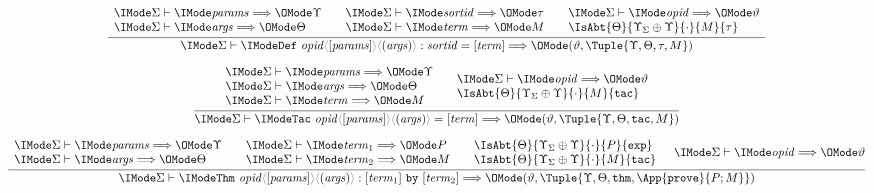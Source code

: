 \begin{gather}
  \infer{
    \Elab{\Sigma}{
      \ProdDefDecl{\SortOpId}{\SortParams}{\SortArgs}{\SortSortId}{\SortTerm}
    }{(\vartheta,\Tuple{\Upsilon,\Theta,\tau,M})}
  }{
    \begin{array}{l}
      \Elab{\Sigma}{\SortParams}{\Upsilon}\\
      \Elab{\Sigma}{\SortArgs}{\Theta}\\
    \end{array} &
    \begin{array}{l}
      \Elab{\Sigma}{\SortSortId}{\tau}\\
      \Elab{\Sigma}{\SortTerm}{M}
    \end{array} &
    \begin{array}{l}
      \Elab{\Sigma}{\SortOpId}{\vartheta}\\
      \IsAbt{\Theta}{\Upsilon_\Sigma\oplus\Upsilon}{\cdot}{M}{\tau}
    \end{array}
  }\\[6pt]
  \infer{
    \Elab{\Sigma}{
      \ProdTacDecl{\SortOpId}{\SortParams}{\SortArgs}{\SortTerm}
    }{(\vartheta,\Tuple{\Upsilon,\Theta,\AbtSortTac,M})}
  }{
    \begin{array}{l}
      \Elab{\Sigma}{\SortParams}{\Upsilon}\\
      \Elab{\Sigma}{\SortArgs}{\Theta}\\
      \Elab{\Sigma}{\SortTerm}{M}
    \end{array} &
    \begin{array}{l}
      \Elab{\Sigma}{\SortOpId}{\vartheta}\\
      \IsAbt{\Theta}{\Upsilon_\Sigma\oplus\Upsilon}{\cdot}{M}{\AbtSortTac}
    \end{array}
  }\\[6pt]
  \infer{
    \Elab{\Sigma}{
      \ProdThmDecl{\SortOpId}{\SortParams}{\SortArgs}{\SortTerm_1}{\SortTerm_2}
    }{(\vartheta,\Tuple{\Upsilon,\Theta,\AbtSortThm,\App{\OpProve}{P;M}})}
  }{
    \begin{array}{l}
      \Elab{\Sigma}{\SortParams}{\Upsilon}\\
      \Elab{\Sigma}{\SortArgs}{\Theta}
    \end{array} &
    \begin{array}{l}
      \Elab{\Sigma}{\SortTerm_1}{P}\\
      \Elab{\Sigma}{\SortTerm_2}{M}
    \end{array} &
    \begin{array}{l}
      \IsAbt{\Theta}{\Upsilon_\Sigma\oplus\Upsilon}{\cdot}{P}{\AbtSortExp}\\
      \IsAbt{\Theta}{\Upsilon_\Sigma\oplus\Upsilon}{\cdot}{M}{\AbtSortTac}
    \end{array} &
    \Elab{\Sigma}{\SortOpId}{\vartheta}
  }
\end{gather}


